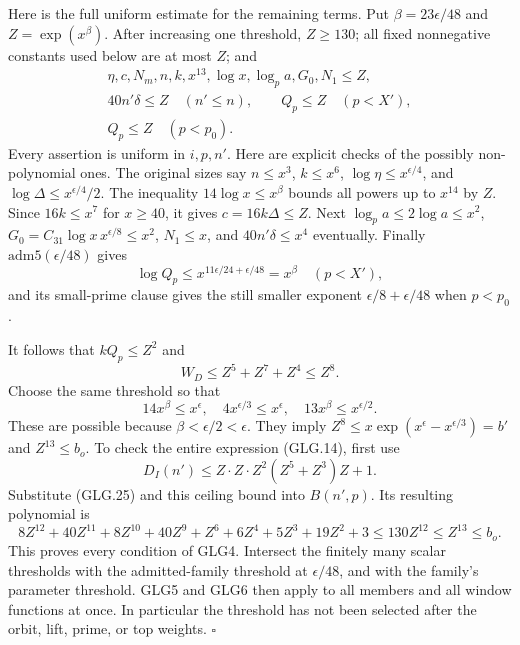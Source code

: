 \documentclass[11pt,a4paper]{article}
\numberwithin{equation}{section}
\theoremstyle{remark}\newtheorem{remark}[theorem]{Remark}
\begin{document}
Here is the full uniform estimate for the remaining terms.
Put \(\beta=23\epsilon/48\) and \(Z=\exp(x^\beta)\).
After increasing one threshold, \(Z\ge130\); all fixed
nonnegative constants used below are at most \(Z\); and
\[
 \begin{gathered}
 \eta,c,N_m,n,k,x^{13},\log x,\log_p a,G_0,N_1\le Z,\\
 40n'\delta\le Z\quad(n'\le n),\qquad Q_p\le Z\quad(p<X'),\\
 Q_p\le Z\quad(p<p_0).
 \end{gathered}                                                     \tag{GLG.25}
\]
Every assertion is uniform in \(i,p,n'\). Here are explicit
checks of the possibly non-polynomial ones. The original
sizes say \(n\le x^3\), \(k\le x^6\),
\(\log\eta\le x^{\epsilon/4}\), and
\(\log\Delta\le x^{\epsilon/4}/2\).
The inequality \(14\log x\le x^\beta\) bounds all powers
up to \(x^{14}\) by \(Z\). Since \(16k\le x^7\) for
\(x\ge40\), it gives \(c=16k\Delta\le Z\).
Next \(\log_pa\le2\log a\le x^2\),
\(G_0=C_{31}\log x\,x^{\epsilon/8}\le x^2\),
\(N_1\le x\), and \(40n'\delta\le x^4\) eventually.
Finally \(\mathrm{adm5}(\epsilon/48)\) gives
\[
 \log Q_p\le x^{11\epsilon/24+\epsilon/48}=x^\beta
       \quad(p<X'),
 \]
and its small-prime clause gives the still smaller exponent
\(\epsilon/8+\epsilon/48\) when \(p<p_0\).

It follows that \(kQ_p\le Z^2\) and
\[
         W_D\le Z^5+Z^7+Z^4\le Z^8 .
 \]
Choose the same threshold so that
\[
 14x^\beta\le x^\epsilon,\quad
 4x^{\epsilon/3}\le x^\epsilon,\quad
 13x^\beta\le x^{\epsilon/2}.
 \]
These are possible because \(\beta<\epsilon/2<\epsilon\).
They imply
\(Z^8\le x\exp(x^\epsilon-x^{\epsilon/3})=b'\) and
\(Z^{13}\le b_o\).
To check the entire expression (GLG.14), first use
\[
 D_I(n')\le
 Z\cdot Z\cdot Z^2(Z^5+Z^3)Z+1 .
 \]
Substitute (GLG.25) and this ceiling bound into \(B(n',p)\).
Its resulting polynomial is
\[
 8Z^{12}+40Z^{11}+8Z^{10}+40Z^9+Z^6
                     +6Z^4+5Z^3+19Z^2+3
          \le130Z^{12}\le Z^{13}\le b_o.                           \tag{GLG.26}
\]
This proves every condition of GLG4. Intersect the finitely many
scalar thresholds with the admitted-family threshold at
\(\epsilon/48\), and with the family's parameter threshold.
GLG5 and GLG6 then apply to all members and all window functions
at once. In particular the threshold has not been selected
after the orbit, lift, prime, or top weights.
\hfill\(\square\)

\end{document}
